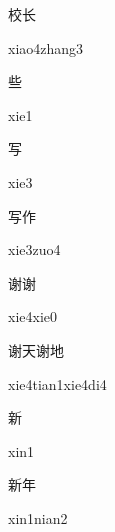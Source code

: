 \begin{multicols*}{2}
\begin{verbete}{校长}
\begin{pronuncia}{xiao4zhang3}
\end{pronuncia}
\end{verbete}

\begin{verbete}[xie1]{些}
\begin{pronuncia}{xie1}
\end{pronuncia}
\end{verbete}

\begin{verbete}[xie3]{写}
\begin{pronuncia}{xie3}
\end{pronuncia}
\end{verbete}

\begin{verbete}{写作}
\begin{pronuncia}{xie3zuo4}
\end{pronuncia}
\end{verbete}

\begin{verbete}{谢谢}
\begin{pronuncia}{xie4xie0}
\end{pronuncia}
\end{verbete}

\begin{verbete}{谢天谢地}
\begin{pronuncia}{xie4tian1xie4di4}
\end{pronuncia}
\end{verbete}

\begin{verbete}[xin1]{新}
\begin{pronuncia}{xin1}
\end{pronuncia}
\end{verbete}

\begin{verbete}{新年}
\begin{pronuncia}{xin1nian2}
\end{pronuncia}
\end{verbete}


\end{multicols*}

